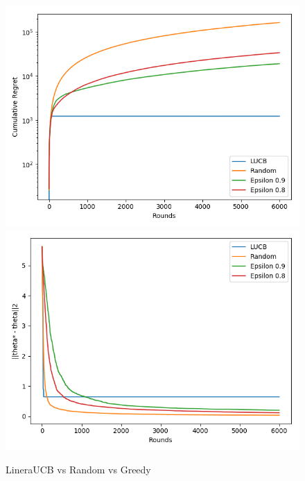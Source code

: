 \documentclass[10pt,a4paper]{article}
\begin{document}
\begin{figure}[h]
\centering
\begin{minipage}{0,90\textwidth}
\caption{LineraUCB vs Random vs Greedy}
\includegraphics[scale=.40]{q3_1.png}
\includegraphics[scale=.40]{q3_2.png}
\end{minipage}
\end{figure}
\end{document}
